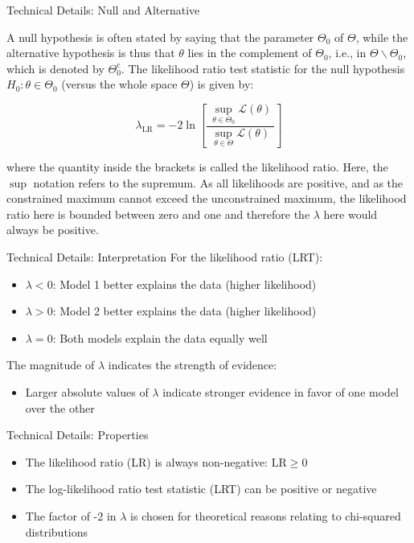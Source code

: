 \begin{frame}{Technical Details: Null and Alternative}

A null hypothesis is often stated by saying that the parameter $\Theta_0$ of $\Theta$, while the alternative hypothesis is thus that $\theta$ lies in the complement of $\Theta_0$, i.e., in $\Theta \backslash \Theta_0$, which is denoted by $\Theta_0^{\text{c}}$. The likelihood ratio test statistic for the null hypothesis $H_0: \theta \in \Theta_0$ (versus the whole space $\Theta$) is given by:

$$
\lambda_{\text{LR}}=-2\ln \left[{\frac {~\sup_{\theta \in \Theta_0}{\mathcal{L}}(\theta)~}{~\sup_{\theta \in \Theta}{\mathcal{L}}(\theta)~}}\right]
$$

where the quantity inside the brackets is called the likelihood ratio. Here, the $\sup$ notation refers to the supremum. As all likelihoods are positive, and as the constrained maximum cannot exceed the unconstrained maximum, the likelihood ratio here is bounded between zero and one and therefore the $\lambda$ here would always be positive.

\end{frame}

\begin{frame}{Technical Details: Interpretation}
For the likelihood ratio (LRT):
\begin{itemize}
\item $\lambda < 0$: Model 1 better explains the data (higher likelihood)
\item $\lambda > 0$: Model 2 better explains the data (higher likelihood)
\item $\lambda = 0$: Both models explain the data equally well
\end{itemize}

The magnitude of $\lambda$ indicates the strength of evidence:
\begin{itemize}
\item Larger absolute values of $\lambda$ indicate stronger evidence in favor of one model over the other
\end{itemize}

\end{frame}

\begin{frame}{Technical Details: Properties}
\begin{itemize}
\item The likelihood ratio (LR) is always non-negative: $\text{LR} \geq 0$
\item The log-likelihood ratio test statistic (LRT) can be positive or negative
\item The factor of -2 in $\lambda$ is chosen for theoretical reasons relating to chi-squared distributions
\end{itemize}
\end{frame}


